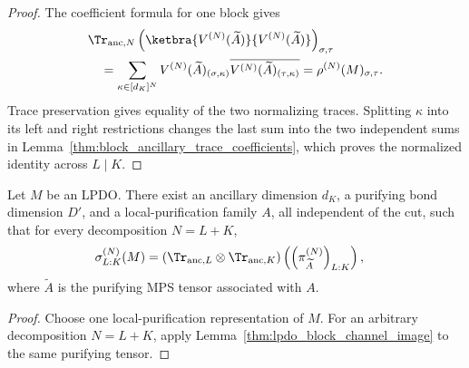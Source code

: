 \begin{proof}\leanok
    The coefficient formula for one block gives
    \begin{align}
         & \Tr_{\mathrm{anc},N}
        \left(\ketbra{V^{(N)}(\widetilde A)}
        {V^{(N)}(\widetilde A)}\right)_{\sigma,\tau}
        \notag                  \\
         & \quad
        =\sum_{\kappa\in[d_K]^N}
        V^{(N)}(\widetilde A)_{(\sigma,\kappa)}
        \overline{V^{(N)}(\widetilde A)_{(\tau,\kappa)}}
        =\rho^{(N)}(M)_{\sigma,\tau}.
        \notag
    \end{align}
    Trace preservation gives equality of the two normalizing traces. Splitting
    $\kappa$ into its left and right restrictions changes the last sum into
    the two independent sums in
    Lemma~\ref{thm:block_ancillary_trace_coefficients}, which proves the
    normalized identity across $L\mid K$.
\end{proof}

\begin{lemma}
    \label{thm:lpdo_exists_cut_uniform_block_channel_image}
    \leanok
    Let $M$ be an LPDO. There exist an ancillary dimension $d_K$, a
    purifying bond dimension $D'$, and a local-purification family $A$, all
    independent of the cut, such that for every decomposition $N=L+K$,
    \begin{align}
        \sigma^{(N)}_{L:K}(M)
         & =\left(\Tr_{\mathrm{anc},L}\otimes
        \Tr_{\mathrm{anc},K}\right)
        \left(\left(\pi_{\widetilde A}^{(N)}\right)_{L:K}\right),
        \notag
    \end{align}
    where $\widetilde A$ is the purifying MPS tensor associated with $A$.
\end{lemma}

\begin{proof}\leanok
    Choose one local-purification representation of $M$. For an arbitrary
    decomposition $N=L+K$, apply
    Lemma~\ref{thm:lpdo_block_channel_image} to the same purifying tensor.
\end{proof}

